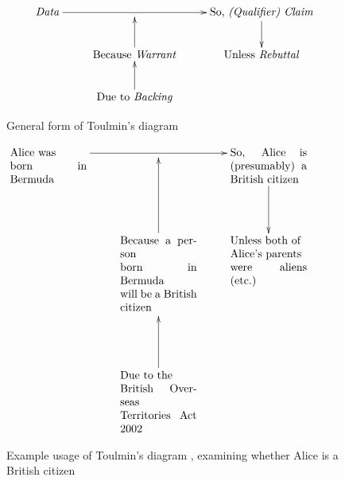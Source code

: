 \begin{figure}[H]
\begin{displaymath}
\xymatrix{
\mbox{\textit{Data}} \ar[rr] && \mbox{So, \textit{(Qualifier) Claim}} \ar[d]\\
& \mbox{Because \textit{Warrant}} \ar[u]& \mbox{Unless \textit{Rebuttal}}\\
& \mbox{Due to \textit{Backing}} \ar[u]&
}\\
\end{displaymath}
\caption{General form of Toulmin's diagram \citep[p.~104]{Toulmin1958}}
\label{figure:toulmin:general}
\end{figure}



\begin{figure}[H]
\begin{displaymath}
\xymatrix{
\mbox{\parbox[t]{0.2\linewidth}{Alice was\\born in Bermuda}} \ar[rr] & & \mbox{\parbox[t]{0.2\linewidth}{So, Alice is (presumably) a British citizen}} \ar[d]  \\
& \mbox{\parbox[t]{0.2\linewidth}{Because a person\\born in Bermuda\\will be a British\\citizen}} \ar[u]& \mbox{\parbox[t]{0.2\linewidth}{Unless both of\\Alice's parents\\were aliens (etc.)}} \\
&&&\\
& \mbox{\parbox[t]{0.2\linewidth}{Due to the\\British Overseas\\Territories Act 2002}} \ar[u]&
}\\
\end{displaymath}
\caption{Example usage of Toulmin's diagram \citep[p.~105]{Toulmin1958}, examining whether Alice is a British citizen}
\label{figure:toulmin:specific}
\end{figure}